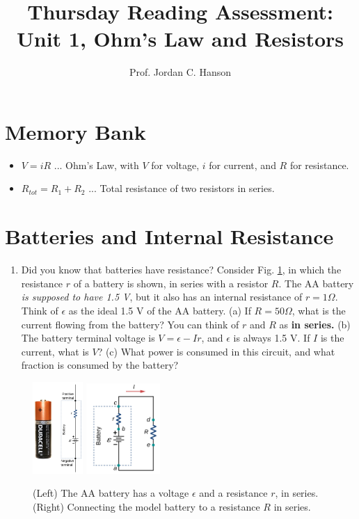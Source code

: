 \documentclass{article}
\begin{document}
\title{Thursday Reading Assessment: Unit 1, Ohm's Law and Resistors}
\author{Prof. Jordan C. Hanson}

\maketitle

\section{Memory Bank}

\begin{itemize}
\item $V = i R$ ... Ohm's Law, with $V$ for voltage, $i$ for current, and $R$ for resistance.
\item $R_{tot} = R_1 + R_2$ ... Total resistance of two resistors in series.
\end{itemize}

\section{Batteries and Internal Resistance}

\begin{enumerate}
\item Did you know that batteries have resistance?  Consider Fig. \ref{fig:1}, in which the resistance $r$ of a battery is shown, in series with a resistor $R$.  The AA battery \textit{is supposed to have 1.5 V}, but it also has an internal resistance of $r = 1\Omega$.  Think of $\epsilon$ as the ideal 1.5 V of the AA battery.  (a) If $R = 50\Omega$, what is the current flowing from the battery?  You can think of $r$ and $R$ as \textbf{in series.}  (b) The battery terminal voltage is $V = \epsilon - Ir$, and $\epsilon$ is always 1.5 V.  If $I$ is the current, what is $V$? (c) What power is consumed in this circuit, and what fraction is consumed by the battery?
\end{enumerate}

\begin{figure}
\centering
\includegraphics[width=0.17\textwidth]{duracell.png} \hspace{3cm}
\includegraphics[width=0.25\textwidth]{duracell2.png}
\caption{\label{fig:1}(Left) The AA battery has a voltage $\epsilon$ and a resistance $r$, in series.  (Right) Connecting the model battery to a resistance $R$ in series.}
\end{figure}
\end{document}
